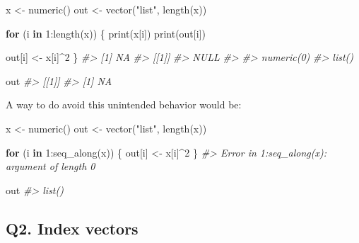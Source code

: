 \documentclass[
]{book}
\newenvironment{Shaded}{\begin{snugshade}}{\end{snugshade}}
\newcommand{\CommentTok}[1]{\textcolor[rgb]{0.56,0.35,0.01}{\textit{#1}}}
\newcommand{\ControlFlowTok}[1]{\textcolor[rgb]{0.13,0.29,0.53}{\textbf{#1}}}
\newcommand{\DecValTok}[1]{\textcolor[rgb]{0.00,0.00,0.81}{#1}}
\newcommand{\FunctionTok}[1]{\textcolor[rgb]{0.00,0.00,0.00}{#1}}
\newcommand{\NormalTok}[1]{#1}
\newcommand{\OtherTok}[1]{\textcolor[rgb]{0.56,0.35,0.01}{#1}}
\newcommand{\SpecialCharTok}[1]{\textcolor[rgb]{0.00,0.00,0.00}{#1}}
\newcommand{\StringTok}[1]{\textcolor[rgb]{0.31,0.60,0.02}{#1}}
\begin{document}
\begin{Shaded}
\begin{Highlighting}[]
\NormalTok{x }\OtherTok{\textless{}{-}} \FunctionTok{numeric}\NormalTok{()}
\NormalTok{out }\OtherTok{\textless{}{-}} \FunctionTok{vector}\NormalTok{(}\StringTok{"list"}\NormalTok{, }\FunctionTok{length}\NormalTok{(x))}

\ControlFlowTok{for}\NormalTok{ (i }\ControlFlowTok{in} \DecValTok{1}\SpecialCharTok{:}\FunctionTok{length}\NormalTok{(x)) \{}
  \FunctionTok{print}\NormalTok{(x[i])}
  \FunctionTok{print}\NormalTok{(out[i])}

\NormalTok{  out[i] }\OtherTok{\textless{}{-}}\NormalTok{ x[i]}\SpecialCharTok{\^{}}\DecValTok{2}
\NormalTok{\}}
\CommentTok{\#\textgreater{} [1] NA}
\CommentTok{\#\textgreater{} [[1]]}
\CommentTok{\#\textgreater{} NULL}
\CommentTok{\#\textgreater{} }
\CommentTok{\#\textgreater{} numeric(0)}
\CommentTok{\#\textgreater{} list()}

\NormalTok{out}
\CommentTok{\#\textgreater{} [[1]]}
\CommentTok{\#\textgreater{} [1] NA}
\end{Highlighting}
\end{Shaded}

A way to do avoid this unintended behavior would be:

\begin{Shaded}
\begin{Highlighting}[]
\NormalTok{x }\OtherTok{\textless{}{-}} \FunctionTok{numeric}\NormalTok{()}
\NormalTok{out }\OtherTok{\textless{}{-}} \FunctionTok{vector}\NormalTok{(}\StringTok{"list"}\NormalTok{, }\FunctionTok{length}\NormalTok{(x))}

\ControlFlowTok{for}\NormalTok{ (i }\ControlFlowTok{in} \DecValTok{1}\SpecialCharTok{:}\FunctionTok{seq\_along}\NormalTok{(x)) \{}
\NormalTok{  out[i] }\OtherTok{\textless{}{-}}\NormalTok{ x[i]}\SpecialCharTok{\^{}}\DecValTok{2}
\NormalTok{\}}
\CommentTok{\#\textgreater{} Error in 1:seq\_along(x): argument of length 0}

\NormalTok{out}
\CommentTok{\#\textgreater{} list()}
\end{Highlighting}
\end{Shaded}

\hypertarget{q2.-index-vectors}{%
\subsection*{Q2. Index vectors}\label{q2.-index-vectors}}
\end{document}
